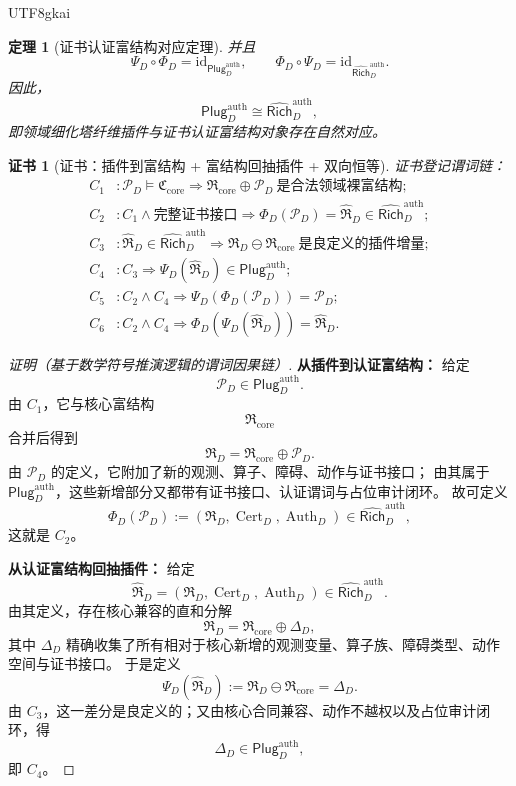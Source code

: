\documentclass[12pt]{article}
\newtheorem{theorem}{定理}[section]
\newtheorem{Certificate}{证书}[section]
\newcommand{\Cert}{\operatorname{Cert}}
\newcommand{\Auth}{\operatorname{Auth}}
\newcommand{\id}{\mathrm{id}}
\begin{document}
\begin{CJK*}{UTF8}{gkai}
\begin{theorem}[证书认证富结构对应定理]
并且
\[
  \Psi_D\circ \Phi_D
  =
  \id_{\mathsf{Plug}_D^{\mathrm{auth}}},
  \qquad
  \Phi_D\circ \Psi_D
  =
  \id_{\widehat{\mathsf{Rich}}_D^{\mathrm{auth}}}.
\]
因此，
\[
  \mathsf{Plug}_D^{\mathrm{auth}}
  \cong
  \widehat{\mathsf{Rich}}_D^{\mathrm{auth}},
\]
即领域细化塔纤维插件与证书认证富结构对象存在自然对应。
\end{theorem}

\begin{Certificate}[证书：插件到富结构 + 富结构回抽插件 + 双向恒等]
\label{cert:tex37-ch8-correspondence}
证书登记谓词链：
\[
\begin{aligned}
  C_1 &: \mathcal P_D\models \mathfrak C_{\mathrm{core}}
  \Rightarrow
  \mathfrak R_{\mathrm{core}}\oplus \mathcal P_D\ \text{是合法领域裸富结构};\\
  C_2 &: C_1\wedge \text{完整证书接口}
  \Rightarrow
  \Phi_D(\mathcal P_D)=\widehat{\mathfrak R}_D\in \widehat{\mathsf{Rich}}_D^{\mathrm{auth}};\\
  C_3 &: \widehat{\mathfrak R}_D\in \widehat{\mathsf{Rich}}_D^{\mathrm{auth}}
  \Rightarrow
  \mathfrak R_D\ominus \mathfrak R_{\mathrm{core}}\ \text{是良定义的插件增量};\\
  C_4 &: C_3\Rightarrow \Psi_D(\widehat{\mathfrak R}_D)\in \mathsf{Plug}_D^{\mathrm{auth}};\\
  C_5 &: C_2\wedge C_4\Rightarrow \Psi_D(\Phi_D(\mathcal P_D))=\mathcal P_D;\\
  C_6 &: C_2\wedge C_4\Rightarrow \Phi_D(\Psi_D(\widehat{\mathfrak R}_D))=\widehat{\mathfrak R}_D.
\end{aligned}
\]
\end{Certificate}

\begin{proof}[证明（基于数学符号推演逻辑的谓词因果链）]
\textbf{从插件到认证富结构：}
给定
\[
  \mathcal P_D\in \mathsf{Plug}_D^{\mathrm{auth}}.
\]
由 $C_1$，它与核心富结构
\[
  \mathfrak R_{\mathrm{core}}
\]
合并后得到
\[
  \mathfrak R_D
  =
  \mathfrak R_{\mathrm{core}}
  \oplus
  \mathcal P_D.
\]
由 $\mathcal P_D$ 的定义，它附加了新的观测、算子、障碍、动作与证书接口；
由其属于 $\mathsf{Plug}_D^{\mathrm{auth}}$，这些新增部分又都带有证书接口、认证谓词与占位审计闭环。
故可定义
\[
  \Phi_D(\mathcal P_D)
  :=
  (\mathfrak R_D,\Cert_D,\Auth_D)
  \in
  \widehat{\mathsf{Rich}}_D^{\mathrm{auth}},
\]
这就是 $C_2$。

\textbf{从认证富结构回抽插件：}
给定
\[
  \widehat{\mathfrak R}_D=(\mathfrak R_D,\Cert_D,\Auth_D)
  \in
  \widehat{\mathsf{Rich}}_D^{\mathrm{auth}}.
\]
由其定义，存在核心兼容的直和分解
\[
  \mathfrak R_D
  =
  \mathfrak R_{\mathrm{core}}
  \oplus
  \Delta_D,
\]
其中 $\Delta_D$ 精确收集了所有相对于核心新增的观测变量、算子族、障碍类型、动作空间与证书接口。
于是定义
\[
  \Psi_D(\widehat{\mathfrak R}_D)
  :=
  \mathfrak R_D\ominus \mathfrak R_{\mathrm{core}}
  =
  \Delta_D.
\]
由 $C_3$，这一差分是良定义的；又由核心合同兼容、动作不越权以及占位审计闭环，得
\[
  \Delta_D
  \in
  \mathsf{Plug}_D^{\mathrm{auth}},
\]
即 $C_4$。


\end{proof}
\end{CJK*}
\end{document}
